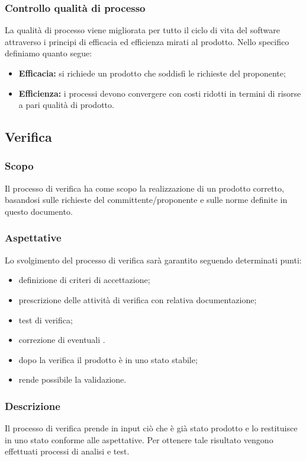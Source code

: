 		\subsubsection{Controllo qualità di processo}
		La qualità di processo viene migliorata per tutto il ciclo di vita del software attraverso i principi di efficacia ed efficienza mirati al prodotto.
			Nello specifico definiamo quanto segue:
			\begin{itemize}
				\item \textbf{Efficacia:} si richiede un prodotto che soddisfi le richieste del proponente;
				\item \textbf{Efficienza:} i processi devono convergere con costi ridotti in termini di risorse a pari qualità di prodotto.
			\end{itemize}
	\subsection{Verifica}
		\subsubsection{Scopo}
			Il processo di verifica ha come scopo la realizzazione di un prodotto corretto, basandosi sulle richieste del committente/proponente e sulle norme definite in questo documento.
		\subsubsection{Aspettative}
		Lo svolgimento del processo di verifica sarà garantito seguendo determinati punti:
    \begin{itemize}
        \item definizione di criteri di accettazione;
	\item prescrizione delle attività di verifica con relativa documentazione;
	\item test di verifica;
	\item correzione di eventuali .
	\item dopo la verifica il prodotto è in uno stato stabile;
	\item rende possibile la validazione.
    \end{itemize}
    	\subsubsection{Descrizione}
		Il processo di verifica prende in input ciò che è già stato prodotto e lo restituisce in uno stato conforme alle aspettative. Per ottenere tale risultato vengono effettuati processi di analisi e test.
